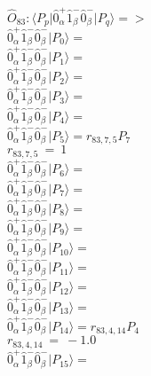 \documentclass[14pt]{article}
\begin{document}
    $\hat{O}_{83}:  \langle{P_p}\vert \hat{0}_{\alpha}^{+}\hat{1}_{\beta}^{-}\hat{0}_{\beta}^{-} \vert{P_q}\rangle => $ \\ 
    $ \hat{0}_{\alpha}^{+}\hat{1}_{\beta}^{-}\hat{0}_{\beta}^{-} \vert{P_{0}}\rangle =  $ \\ 
    $ \hat{0}_{\alpha}^{+}\hat{1}_{\beta}^{-}\hat{0}_{\beta}^{-} \vert{P_{1}}\rangle =  $ \\ 
    $ \hat{0}_{\alpha}^{+}\hat{1}_{\beta}^{-}\hat{0}_{\beta}^{-} \vert{P_{2}}\rangle =  $ \\ 
    $ \hat{0}_{\alpha}^{+}\hat{1}_{\beta}^{-}\hat{0}_{\beta}^{-} \vert{P_{3}}\rangle =  $ \\ 
    $ \hat{0}_{\alpha}^{+}\hat{1}_{\beta}^{-}\hat{0}_{\beta}^{-} \vert{P_{4}}\rangle =  $ \\ 
    $ \hat{0}_{\alpha}^{+}\hat{1}_{\beta}^{-}\hat{0}_{\beta}^{-} \vert{P_{5}}\rangle = {r}_{83,7,5}P_{7} $ \\ 
    ${r}_{83,7,5}\ =\ 1 $ \\ 
    $ \hat{0}_{\alpha}^{+}\hat{1}_{\beta}^{-}\hat{0}_{\beta}^{-} \vert{P_{6}}\rangle =  $ \\ 
    $ \hat{0}_{\alpha}^{+}\hat{1}_{\beta}^{-}\hat{0}_{\beta}^{-} \vert{P_{7}}\rangle =  $ \\ 
    $ \hat{0}_{\alpha}^{+}\hat{1}_{\beta}^{-}\hat{0}_{\beta}^{-} \vert{P_{8}}\rangle =  $ \\ 
    $ \hat{0}_{\alpha}^{+}\hat{1}_{\beta}^{-}\hat{0}_{\beta}^{-} \vert{P_{9}}\rangle =  $ \\ 
    $ \hat{0}_{\alpha}^{+}\hat{1}_{\beta}^{-}\hat{0}_{\beta}^{-} \vert{P_{10}}\rangle =  $ \\ 
    $ \hat{0}_{\alpha}^{+}\hat{1}_{\beta}^{-}\hat{0}_{\beta}^{-} \vert{P_{11}}\rangle =  $ \\ 
    $ \hat{0}_{\alpha}^{+}\hat{1}_{\beta}^{-}\hat{0}_{\beta}^{-} \vert{P_{12}}\rangle =  $ \\ 
    $ \hat{0}_{\alpha}^{+}\hat{1}_{\beta}^{-}\hat{0}_{\beta}^{-} \vert{P_{13}}\rangle =  $ \\ 
    $ \hat{0}_{\alpha}^{+}\hat{1}_{\beta}^{-}\hat{0}_{\beta}^{-} \vert{P_{14}}\rangle = {r}_{83,4,14}P_{4} $ \\ 
    ${r}_{83,4,14}\ =\ -1.0 $ \\ 
    $ \hat{0}_{\alpha}^{+}\hat{1}_{\beta}^{-}\hat{0}_{\beta}^{-} \vert{P_{15}}\rangle =  $ \\ 
    
\end{document}
